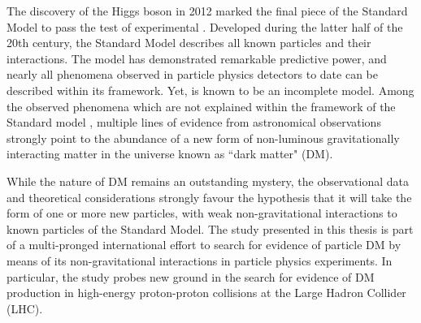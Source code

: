 \label{chapter:introduction}

The discovery of the Higgs boson in 2012 \cite{atlas_higgs_2012, cms_higgs_2012} marked the final piece of the Standard Model to pass the test of experimental . Developed during the latter half of the 20th century, the Standard Model describes all known particles and their interactions. The model has demonstrated remarkable predictive power, and nearly all phenomena observed in particle physics detectors to date can be described within its framework. Yet, is known to be an incomplete model. Among the observed phenomena which are not explained within the framework of the Standard model \cite{einstein_1920, neutrino_oscillations_1998, Canetti_2012}, multiple lines of evidence from astronomical observations strongly point to the abundance of a new form of non-luminous gravitationally interacting matter in the universe known as ``dark matter" (DM). 

While the nature of DM remains an outstanding mystery, the observational data and theoretical considerations strongly favour the hypothesis that it will take the form of one or more new particles, with weak non-gravitational interactions to known particles of the Standard Model. The study presented in this thesis is part of a multi-pronged international effort to search for evidence of particle DM by means of its non-gravitational interactions in particle physics experiments. In particular, the study probes new ground in the search for evidence of DM production in high-energy proton-proton collisions at the Large Hadron Collider (LHC). 

